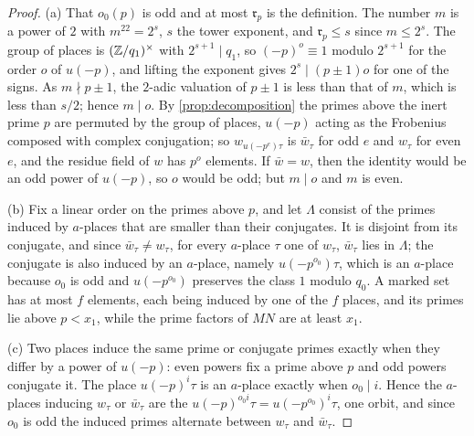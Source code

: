 \begin{proof}
(a) That $o_0(p)$ is odd and at most $\mathfrak r_p$ is the definition. The number $m$ is a power of $2$ with $m^{22}=2^s$, $s$ the tower exponent, and $\mathfrak r_p\le s$ since $m\le2^s$. The group of places is $(\mathbb{Z}/q_1)^\times$ with $2^{s+1}\mid q_1$, so $(-p)^o\equiv1$ modulo $2^{s+1}$ for the order $o$ of $u(-p)$, and lifting the exponent gives
$2^s\mid(p\pm1)o$ for one of the signs. As $m\nmid p\pm1$, the $2$-adic valuation of $p\pm1$ is less than that of $m$, which is less than $s/2$; hence $m\mid o$. By \cref{prop:decomposition} the primes above the inert prime $p$ are permuted by the group of places, $u(-p)$ acting as the Frobenius composed with complex conjugation; so $w_{u(-p^e)\tau}$ is $\bar w_\tau$
for odd $e$ and $w_\tau$ for even $e$, and the residue field of $w$ has $p^o$ elements. If $\bar w=w$, then the identity would be an odd power of $u(-p)$, so $o$ would be odd; but $m\mid o$ and $m$ is even.

(b) Fix a linear order on the primes above $p$, and let $\Lambda$ consist of the primes induced by $a$-places that are smaller than their conjugates. It is disjoint from its conjugate, and since $\bar w_\tau\ne w_\tau$, for every $a$-place $\tau$ one of $w_\tau$, $\bar w_\tau$ lies in $\Lambda$; the conjugate is also induced by an $a$-place, namely $u(-p^{o_0})\tau$, which is an $a$-place
because $o_0$ is odd and $u(-p^{o_0})$ preserves the class $1$ modulo $q_0$. A marked set has at most $f$ elements, each being induced by one of the $f$ places, and its primes lie above $p<x_1$, while the prime factors of $MN$ are at least $x_1$.

(c) Two places induce the same prime or conjugate primes exactly when they differ by a power of $u(-p)$: even powers fix a prime above $p$ and odd powers conjugate it. The place $u(-p)^i\tau$ is an $a$-place exactly when $o_0\mid i$. Hence the $a$-places inducing $w_\tau$ or $\bar w_\tau$ are the $u(-p)^{o_0i}\tau=u(-p^{o_0})^i\tau$, one orbit, and since $o_0$ is odd the
induced primes alternate between $w_\tau$ and $\bar w_\tau$.


\end{proof}
